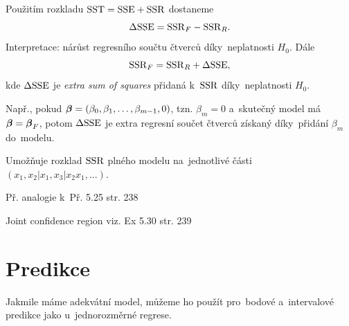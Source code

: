 \begin{remark}
Použitím rozkladu $\mathrm{SST} = \mathrm{SSE} + \mathrm{SSR}$ dostaneme
 $$
\Delta \mathrm{SSE} = \mathrm{SSR}_F - \mathrm{SSR}_R.
 $$
Interpretace: nárůst regresního součtu čtverců díky~neplatnosti $H_0$. Dále
 $$
\mathrm{SSR}_F = \mathrm{SSR}_R + \Delta \mathrm{SSE},
 $$
kde $\Delta \mathrm{SSE}$ je \textit{extra sum of squares} přidaná k~$\mathrm{SSR}$ díky~neplatnosti $H_0$.

Např., pokud $\boldsymbol{\beta} = (\beta_0, \beta_1,\dots, \beta_{m-1}, 0)$, tzn. $\beta_m = 0$ a~skutečný model má $\boldsymbol{\beta} = \boldsymbol{\beta}_F$, potom $\Delta \mathrm{SSE}$ je extra regresní součet čtverců získaný díky~přidání $\beta_m$ do~modelu.

Umožňuje rozklad $\mathrm{SSR}$ plného modelu na~jednotlivé části $\left(x_1, x_2 | x_1, x_3 | x_2 x_1,... \right)$.
\end{remark}

Př. analogie k~Př. 5.25 str. 238

\begin{remark}
	Joint confidence region viz. Ex 5.30 str. 239
\end{remark}



\section{Predikce}
Jakmile máme adekvátní model, můžeme ho použít pro~bodové a~intervalové predikce jako u~jednorozměrné regrese.

